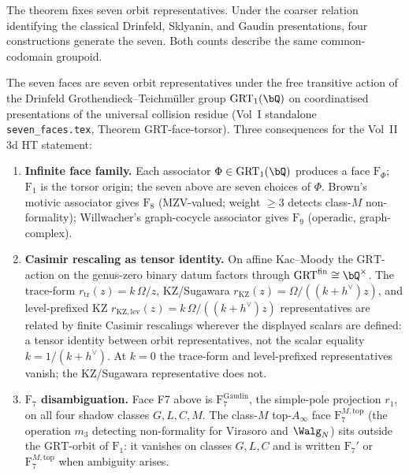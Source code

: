 \begin{remark}
\label{rem:seven-vs-four-resolution}
The theorem fixes seven orbit representatives. Under the coarser
relation identifying the classical Drinfeld, Sklyanin, and Gaudin
presentations, four constructions generate the seven. Both counts
describe the same common-codomain groupoid.
\end{remark}

\begin{remark}
\label{rem:grt-torsor-3d-ht}
\label{rem:grt-casimir-fm99}
The seven faces are seven orbit representatives under the free
transitive action of the Drinfeld Grothendieck--Teichm\"uller
group $\mathrm{GRT}_1(\bQ)$ on coordinatised presentations of the
universal collision residue (Vol~I standalone
\texttt{seven\_faces.tex}, Theorem GRT-face-torsor). Three
consequences for the Vol~II 3d HT statement:

\begin{enumerate}[label=\textup{(\roman*)}]
\item \textbf{Infinite face family.} Each associator
$\Phi\in\mathrm{GRT}_1(\bQ)$ produces a face $\mathrm{F}_\Phi$;
$\mathrm{F}_1$ is the torsor origin; the seven above are seven
choices of $\Phi$. Brown's motivic associator gives
$\mathrm{F}_8$ (MZV-valued; weight $\geq 3$ detects class-$M$
non-formality); Willwacher's graph-cocycle associator gives
$\mathrm{F}_9$ (operadic, graph-complex).

\item \textbf{Casimir rescaling as tensor identity.} On affine
Kac--Moody the $\mathrm{GRT}$-action on the genus-zero binary
datum factors through $\mathrm{GRT}^{\mathrm{fin}}\cong\bQ^\times$.
The trace-form $r_{\mathrm{tr}}(z)=k\,\Omega/z$, KZ/Sugawara
$r_{\mathrm{KZ}}(z)=\Omega/((k+h^\vee)z)$, and level-prefixed KZ
$r_{\mathrm{KZ,lev}}(z)=k\,\Omega/((k+h^\vee)z)$ representatives
are related by finite Casimir rescalings wherever the displayed
scalars are defined: a tensor identity between orbit
representatives, not the scalar equality $k = 1/(k+h^\vee)$. At
$k=0$ the trace-form and level-prefixed representatives vanish;
the KZ/Sugawara representative does not.

\item \textbf{$\mathrm{F}_7$ disambiguation.} Face F7 above is
$\mathrm{F}_7^{\mathrm{Gaudin}}$, the simple-pole projection
$r_1$, on all four shadow classes $G,L,C,M$. The class-$M$
top-$A_\infty$ face $\mathrm{F}_7^{M,\mathrm{top}}$ (the operation
$m_3$ detecting non-formality for Virasoro and $\Walg_N$) sits
outside the $\mathrm{GRT}$-orbit of $\mathrm{F}_1$: it vanishes on
classes $G,L,C$ and is written $\mathrm{F}_7'$ or
$\mathrm{F}_7^{M,\mathrm{top}}$ when ambiguity arises.


\end{enumerate}
\end{remark}
